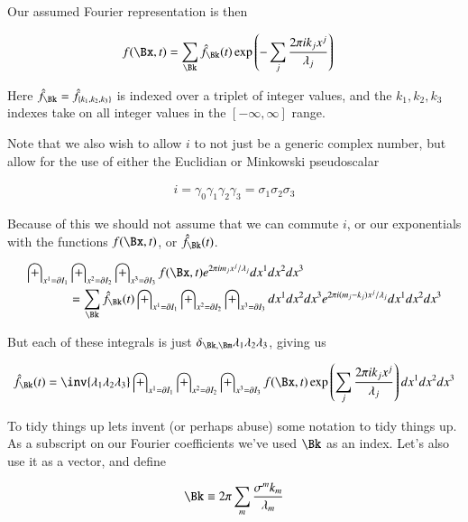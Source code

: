 \documentclass{article}
\begin{document}
Our assumed Fourier representation is then

\begin{align*}
f(\Bx, t) &= \sum_{\Bk} \hat{f}_{\Bk}(t) \exp\left( - \sum_j \frac{2 \pi i k_j x^j}{\lambda_j} \right)
\end{align*}

Here $\hat{f}_{\Bk} = \hat{f}_{\{k_1, k_2, k_3\}}$ is indexed over a triplet of integer values, and the $k_1, k_2, k_3$ indexes take on all integer values in the $[-\infty, \infty]$ range.

Note that we also wish to allow $i$ to not just be a generic complex number, but allow for the use of either the Euclidian or Minkowski pseudoscalar

\begin{align*}
i = \gamma_0 \gamma_1 \gamma_2 \gamma_3 = \sigma_1 \sigma_2 \sigma_3
\end{align*}

Because of this we should not assume that we can commute $i$, or our exponentials with the functions $f(\Bx,t)$, or $\hat{f}_{\Bk}(t)$.

\begin{align*}
\int_{x^1 = \partial I_1} &\int_{x^2 = \partial I_2} \int_{x^3 = \partial I_3} f(\Bx, t) 
e^{ 2 \pi i m_j x^j/\lambda_j}
dx^1 dx^2 dx^3 \\
&= \sum_{\Bk} \hat{f}_{\Bk}(t) \int_{x^1 = \partial I_1} \int_{x^2 = \partial I_2} \int_{x^3 = \partial I_3} dx^1 dx^2 dx^3 e^{ 2 \pi i (m_j - k_j) x^j/\lambda_j} dx^1 dx^2 dx^3
\end{align*}

But each of these integrals is just $\delta_{\Bk,\Bm} \lambda_1 \lambda_2 \lambda_3$, giving us

\begin{align*}
\hat{f}_{\Bk}(t)
&= \inv{\lambda_1 \lambda_2 \lambda_3 } \int_{x^1 = \partial I_1} \int_{x^2 = \partial I_2} \int_{x^3 = \partial I_3} f(\Bx, t) \exp\left( \sum_j \frac{2 \pi i k_j x^j}{\lambda_j} \right) dx^1 dx^2 dx^3 \\
\end{align*}

To tidy things up 
lets invent (or perhaps abuse) some notation to tidy things up.  As a subscript on our Fourier coefficients we've used $\Bk$ as an index.
Let's also use it as a vector, and define

\begin{align}
\Bk \equiv 2 \pi \sum_m \frac{\sigma^m k_m}{\lambda_m}
\end{align}
\end{document}
